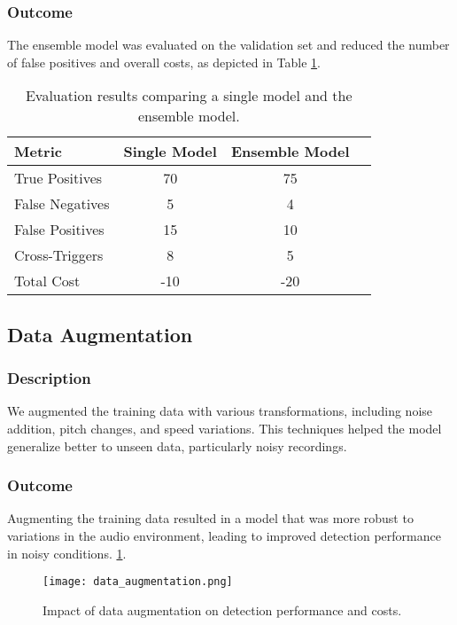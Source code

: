 \subsubsection{Outcome}
The ensemble model was evaluated on the validation set and reduced the number of false positives and overall costs, as depicted in Table \ref{tab:ensemble_results}.

\begin{table}[h]
\centering
\begin{tabular}{lccc}
\toprule
Metric & Single Model & Ensemble Model \\
\midrule
True Positives & 70 & 75 \\
False Negatives & 5 & 4 \\
False Positives & 15 & 10 \\
Cross-Triggers & 8 & 5 \\
Total Cost & -10 & -20 \\
\bottomrule
\end{tabular}
\caption{Evaluation results comparing a single model and the ensemble model.}
\label{tab:ensemble_results}
\end{table}

\subsection{Data Augmentation}
\subsubsection{Description}
We augmented the training data with various transformations, including noise addition, pitch changes, and speed variations. This techniques helped the model generalize better to unseen data, particularly noisy recordings.

\subsubsection{Outcome}
Augmenting the training data resulted in a model that was more robust to variations in the audio environment, leading to improved detection performance in noisy conditions.
\ref{fig:data_augmentation}.

\begin{figure}[h]
\centering
\texttt{[image: data\_augmentation.png]}
\caption{Impact of data augmentation on detection performance and costs.}
\label{fig:data_augmentation}
\end{figure}
